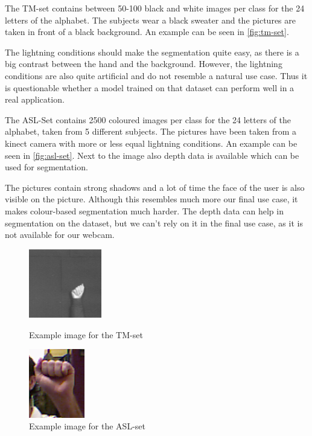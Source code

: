 \documentclass[letterpaper, 10 pt, conference]{ieeeconf}  %
\begin{document}
The TM-set contains between 50-100 black and white images per class for the 24 letters of the alphabet. The subjects wear a black sweater and the pictures are taken in front of a black background. An example can be seen in \autoref{fig:tm-set}.

The lightning conditions should make the segmentation quite easy, as there is a big contrast between the hand and the background. However, the lightning conditions are also quite artificial and do not resemble a natural use case. Thus it is questionable whether a model trained on that dataset can perform well in a real application.

The ASL-Set contains 2500 coloured images per class for the 24 letters of the alphabet, taken from 5 different subjects. The pictures have been taken from a kinect camera with more or less equal lightning conditions. An example can be seen in \autoref{fig:asl-set}. Next to the image also depth data is available which can be used for segmentation.

The pictures contain strong shadows and a lot of time the face of the user is also visible on the picture. Although this resembles much more our final use case, it makes colour-based segmentation much harder. The depth data can help in segmentation on the dataset, but we can't rely on it in the final use case, as it is not available for our webcam.

\begin{figure}
\centering
\begin{minipage}{0.4\linewidth}
	\centering
\includegraphics[height=3cm]{a-tm}
\caption{Example image for the TM-set}
\label{fig:tm-set}
\end{minipage}
\hfill
\begin{minipage}{0.4\linewidth}
	\centering
\includegraphics[height=3cm]{a-asl}
\caption{Example image for the ASL-set}
\label{fig:asl-set}
\end{minipage}
\end{figure}
\end{document}
